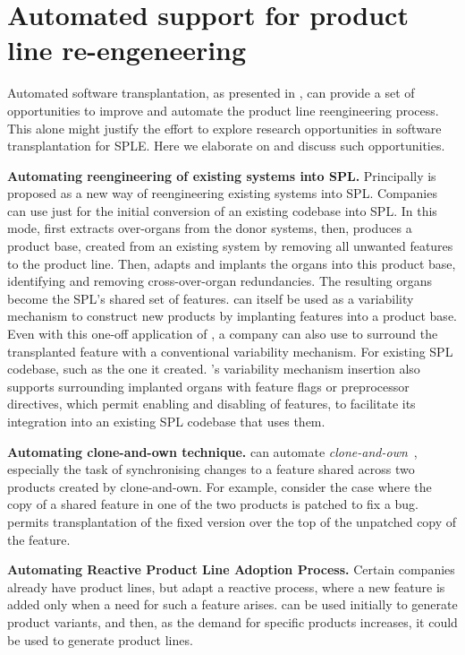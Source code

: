 \section{Automated support for product line re-engeneering} \label{sec:automated_spl_reengineering}

Automated software transplantation, as presented in \FOUNDRY, can provide a set of opportunities to improve and automate the product line reengineering process. This alone might justify the effort to explore research opportunities in software transplantation for SPLE. Here we elaborate on and discuss such opportunities.

\textbf{ Automating reengineering of existing systems into SPL.} Principally \FOUNDRY is proposed as a new way of reengineering existing systems into SPL. 
Companies can use \FOUNDRY just for the initial conversion of an existing codebase into SPL. In this mode, \FOUNDRY first extracts over-organs from the donor systems, then, produces a product base, created from an existing system by removing all unwanted features to the product line. Then, adapts and implants the organs into this product base, identifying and removing cross-over-organ redundancies. The resulting organs become the SPL's shared set of features. \FOUNDRY can itself be used as a variability mechanism to construct new products by implanting features into a product base. Even with this one-off application of \FOUNDRY, a company can also use \FOUNDRY to surround the transplanted feature with  a conventional variability mechanism. For existing SPL codebase, such as the one it created. \FOUNDRY's variability mechanism insertion also supports surrounding implanted organs with feature flags or preprocessor directives, which permit enabling and disabling of features, to facilitate its integration into an existing SPL codebase that uses them.

\textbf{Automating clone-and-own technique.} \FOUNDRY can automate \emph{clone-and-own}~\cite{Dubinsky2013, Fischer2015}, especially the task of synchronising changes to a feature shared across two products created by clone-and-own. For example, consider the case where the copy of a shared feature in one of the two products is patched to fix a bug. \FOUNDRY permits transplantation of the fixed version over the top of the unpatched copy of the feature. 

\textbf{Automating Reactive Product Line Adoption Process.} 
Certain companies already have product lines, but adapt a reactive process, where a new feature is added only when a need for such a feature arises. 
\FOUNDRY can be used initially to generate product variants, and then, as the demand for specific products increases, it could be used to generate product lines.

